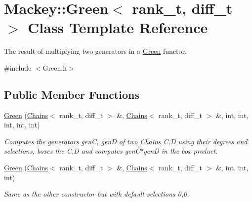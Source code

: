 \hypertarget{classMackey_1_1Green}{}\section{Mackey\+:\+:Green$<$ rank\+\_\+t, diff\+\_\+t $>$ Class Template Reference}
\label{classMackey_1_1Green}


The result of multiplying two generators in a \hyperlink{classMackey_1_1Green}{Green} functor.  




{\ttfamily \#include $<$Green.\+h$>$}

\subsection*{Public Member Functions}
\begin{DoxyCompactItemize}
\item 
\hyperlink{classMackey_1_1Green_a69095b3ff3f46ce70240df08aa1ba55b}{Green} (\hyperlink{classMackey_1_1Chains}{Chains}$<$ rank\+\_\+t, diff\+\_\+t $>$ \&, \hyperlink{classMackey_1_1Chains}{Chains}$<$ rank\+\_\+t, diff\+\_\+t $>$ \&, int, int, int, int, int)
\begin{DoxyCompactList}\small\item\em Computes the generators genC, genD of two \hyperlink{classMackey_1_1Chains}{Chains} C,D using their degrees and selections, boxes the C,D and computes gen\+C$\ast$genD in the box product. \end{DoxyCompactList}\item 
\hyperlink{classMackey_1_1Green_a5e51ae3cad1570c7a9bf2b395852982a}{Green} (\hyperlink{classMackey_1_1Chains}{Chains}$<$ rank\+\_\+t, diff\+\_\+t $>$ \&, \hyperlink{classMackey_1_1Chains}{Chains}$<$ rank\+\_\+t, diff\+\_\+t $>$ \&, int, int, int)
\begin{DoxyCompactList}\small\item\em Same as the other constructor but with default selections 0,0. \end{DoxyCompactList}\end{DoxyCompactItemize}
